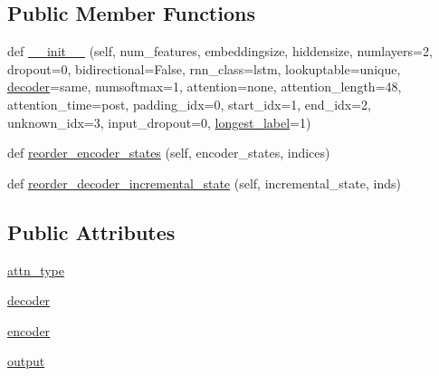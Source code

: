 \subsection*{Public Member Functions}
\begin{DoxyCompactItemize}
\item 
def \hyperlink{classparlai_1_1agents_1_1seq2seq_1_1modules_1_1Seq2seq_a8e8ad02405bcaf384e154a0e238fc10d}{\+\_\+\+\_\+init\+\_\+\+\_\+} (self, num\+\_\+features, embeddingsize, hiddensize, numlayers=2, dropout=0, bidirectional=False, rnn\+\_\+class=\textquotesingle{}lstm\textquotesingle{}, lookuptable=\textquotesingle{}unique\textquotesingle{}, \hyperlink{classparlai_1_1agents_1_1seq2seq_1_1modules_1_1Seq2seq_a832563fd770ab89f2ff6a9ddf025b5c0}{decoder}=\textquotesingle{}same\textquotesingle{}, numsoftmax=1, attention=\textquotesingle{}none\textquotesingle{}, attention\+\_\+length=48, attention\+\_\+time=\textquotesingle{}post\textquotesingle{}, padding\+\_\+idx=0, start\+\_\+idx=1, end\+\_\+idx=2, unknown\+\_\+idx=3, input\+\_\+dropout=0, \hyperlink{classparlai_1_1core_1_1torch__generator__agent_1_1TorchGeneratorModel_a14dcf5ba14c4438bb4919565ebd30fa8}{longest\+\_\+label}=1)
\item 
def \hyperlink{classparlai_1_1agents_1_1seq2seq_1_1modules_1_1Seq2seq_a8161e20a5368471c58ec73e74ba35f48}{reorder\+\_\+encoder\+\_\+states} (self, encoder\+\_\+states, indices)
\item 
def \hyperlink{classparlai_1_1agents_1_1seq2seq_1_1modules_1_1Seq2seq_a8503e583661f0d824e0aa070b3d6ff42}{reorder\+\_\+decoder\+\_\+incremental\+\_\+state} (self, incremental\+\_\+state, inds)
\end{DoxyCompactItemize}
\subsection*{Public Attributes}
\begin{DoxyCompactItemize}
\item 
\hyperlink{classparlai_1_1agents_1_1seq2seq_1_1modules_1_1Seq2seq_a8337117b93156343eac3948bed19d6b0}{attn\+\_\+type}
\item 
\hyperlink{classparlai_1_1agents_1_1seq2seq_1_1modules_1_1Seq2seq_a832563fd770ab89f2ff6a9ddf025b5c0}{decoder}
\item 
\hyperlink{classparlai_1_1agents_1_1seq2seq_1_1modules_1_1Seq2seq_add3b14b89043ce0d8154810d082b0e52}{encoder}
\item 
\hyperlink{classparlai_1_1agents_1_1seq2seq_1_1modules_1_1Seq2seq_abccc59e50a65fe8e1b7ca9d3d29fd070}{output}
\end{DoxyCompactItemize}
